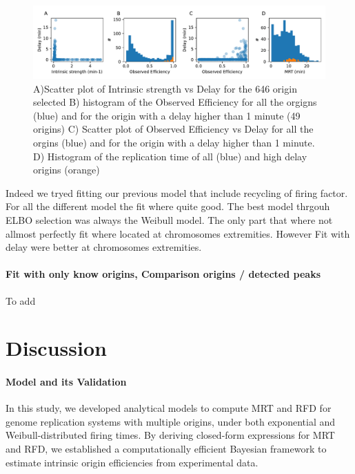 \documentclass[10pt,a4paper]{revtex4-2}
\begin{document}
\begin{figure}
\includegraphics[width=1.0\textwidth]{figures/analyse_ori.pdf}

\caption{A)Scatter plot of Intrinsic strength vs Delay for the 646 origin selected 
B) histogram of the Observed Efficiency for all the orgigns (blue) and for the origin with a delay higher than 1 minute (49 origins) C) Scatter plot of Observed Efficiency vs Delay for all the orgins (blue) and for the origin with a delay higher than 1 minute. D) Histogram of the replication time of all (blue) and high delay origins (orange)}\label{fig:fit_elbo}
\end{figure}

Indeed we tryed fitting our previous model \cite{Arbona2023} that include recycling of firing factor. 
For all the different model the fit where quite good. 
The best model thrgouh ELBO selection was always the Weibull model. 
The only part that where not allmost perfectly fit where located at chromosomes extremities. 
However Fit with delay were better at chromosomes extremities.


\paragraph{Fit with only know origins, Comparison origins / detected peaks}

To add


\section{Discussion}

\paragraph{Model and its Validation}

In this study, we developed analytical models to compute MRT and RFD for genome replication systems with multiple origins, under both exponential and Weibull-distributed firing times. By deriving closed-form expressions for MRT and RFD, we established a computationally efficient Bayesian framework to estimate intrinsic origin efficiencies from experimental data.
\end{document}
